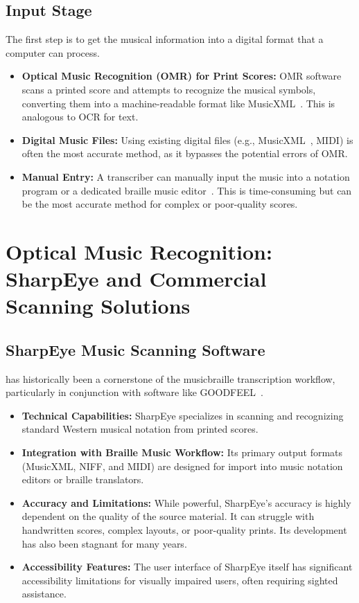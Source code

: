 \subsection{Input Stage}\label{ch10:ssec:input-stage}
The first step is to get the musical information into a digital format that a computer can process.
\begin{itemize}
	\item \textbf{Optical Music Recognition (OMR) for Print Scores:} \gls{OMR} software scans a printed score and attempts to recognize the musical symbols, converting them into a machine-readable format like \gls{MusicXML}~\supercite{researchgate-polyphonic-omr, musescore-omr}. This is analogous to \gls{OCR} for text.
	\item \textbf{Digital Music Files:} Using existing digital files (e.g., \gls{MusicXML}~\supercite{daisy-musicxml}, MIDI) is often the most accurate method, as it bypasses the potential errors of \gls{OMR}.
	\item \textbf{Manual Entry:} A transcriber can manually input the music into a notation program or a dedicated braille music editor~\supercite{braillemusiceditor, braillemusicnotator}. This is time-consuming but can be the most accurate method for complex or poor-quality scores.
\end{itemize}

\section{Optical Music Recognition: SharpEye and Commercial Scanning Solutions}\label{ch10:sec:omr-solutions}

\subsection{SharpEye Music Scanning Software}\label{ch10:ssec:sharpeye}
 has historically been a cornerstone of the \gls{musicbraille} transcription workflow, particularly in conjunction with software like GOODFEEL~\supercite{dancingdots-goodfeel}.
\begin{itemize}
	\item \textbf{Technical Capabilities:} SharpEye specializes in scanning and recognizing standard Western musical notation from printed scores.
	\item \textbf{Integration with Braille Music Workflow:} Its primary output formats (\gls{MusicXML}, NIFF, and MIDI) are designed for import into music notation editors or braille translators.
	\item \textbf{Accuracy and Limitations:} While powerful, SharpEye's accuracy is highly dependent on the quality of the source material. It can struggle with handwritten scores, complex layouts, or poor-quality prints. Its development has also been stagnant for many years.
	\item \textbf{Accessibility Features:} The user interface of SharpEye itself has significant accessibility limitations for visually impaired users, often requiring sighted assistance.
\end{itemize}


